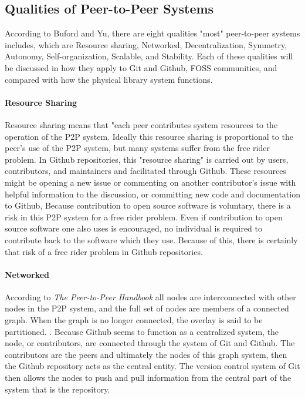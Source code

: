 \subsection{Qualities of Peer-to-Peer Systems}

According to Buford and Yu, there are eight qualities "most" peer-to-peer systems includes, which are Resource sharing, Networked, Decentralization, Symmetry, Autonomy, Self-organization, Scalable, and Stability\cite{peertopeerhandbook}. Each of these qualities will be discussed in how they apply to Git and Github, FOSS communities, and compared with how the physical library system functions. 

\paragraph{Resource Sharing}

Resource sharing means that "each peer contributes system resources to the operation of the P2P system. Ideally this resource sharing is proportional to the peer’s use of the
P2P system, but many systems suffer from the free rider problem\cite{peertopeerhandbook}. In Github repositories, this "resource sharing" is carried out by users, contributors, and maintainers and facilitated through Github. These resources might be opening a new issue or commenting on another contributor's issue with helpful information to the discussion, or committing new code and documentation to Github, Because contribution to open source software is voluntary, there is a risk in this P2P system for a free rider problem. Even if contribution to open source software one also uses is encouraged, no individual is required to contribute back to the software which they use. Because of this, there is certainly that risk of a free rider problem in Github repositories.

\paragraph{Networked}

According to \textit{The Peer-to-Peer Handbook} all nodes are interconnected with other nodes in the P2P system, and
the full set of nodes are members of a connected graph. When the graph is no
longer connected, the overlay is said to be partitioned. \cite{peertopeerhandbook}. Because Github seems to function as a centralized system, the node, or contributors, are connected through the system of Git and Github. The contributors are the peers and ultimately the nodes of this graph system, then the Github repository acts as the central entity. The version control system of Git then allows the nodes to push and pull information from the central part of the system that is the repository. 

